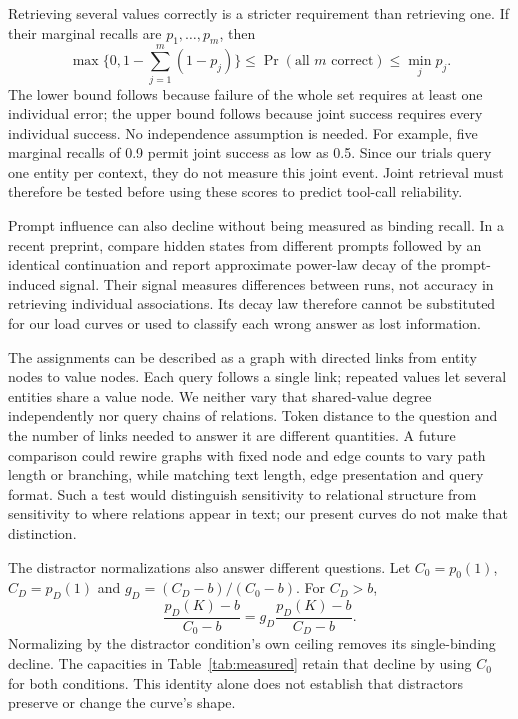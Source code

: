 \documentclass{article}
\begin{document}
Retrieving several values correctly is a stricter requirement than retrieving one.
If their marginal recalls are $p_1,\ldots,p_m$, then
\begin{equation}
\max\Big\{0,1-\sum_{j=1}^{m}(1-p_j)\Big\}
\leq \Pr(\text{all }m\text{ correct})\leq\min_j p_j.
\label{eq:joint-recall}
\end{equation}
The lower bound follows because failure of the whole set requires at least one individual error; the upper bound follows because joint success requires every individual success.
No independence assumption is needed.
For example, five marginal recalls of 0.9 permit joint success as low as 0.5.
Since our trials query one entity per context, they do not measure this joint event.
Joint retrieval must therefore be tested before using these scores to predict tool-call reliability.

Prompt influence can also decline without being measured as binding recall.
In a recent preprint, \citet{xiang2026} compare hidden states from different prompts followed by an identical continuation and report approximate power-law decay of the prompt-induced signal.
Their signal measures differences between runs, not accuracy in retrieving individual associations.
Its decay law therefore cannot be substituted for our load curves or used to classify each wrong answer as lost information.

The assignments can be described as a graph with directed links from entity nodes to value nodes.
Each query follows a single link; repeated values let several entities share a value node.
We neither vary that shared-value degree independently nor query chains of relations.
Token distance to the question and the number of links needed to answer it are different quantities.
A future comparison could rewire graphs with fixed node and edge counts to vary path length or branching, while matching text length, edge presentation and query format.
Such a test would distinguish sensitivity to relational structure from sensitivity to where relations appear in text; our present curves do not make that distinction.

The distractor normalizations also answer different questions.
Let $C_0=p_0(1)$, $C_D=p_D(1)$ and $g_D=(C_D-b)/(C_0-b)$.
For $C_D>b$,
\begin{equation}
\frac{p_D(K)-b}{C_0-b}=g_D\frac{p_D(K)-b}{C_D-b}.
\label{eq:ceiling-decomposition}
\end{equation}
Normalizing by the distractor condition's own ceiling removes its single-binding decline.
The capacities in Table~\ref{tab:measured} retain that decline by using $C_0$ for both conditions.
This identity alone does not establish that distractors preserve or change the curve's shape.
\end{document}
